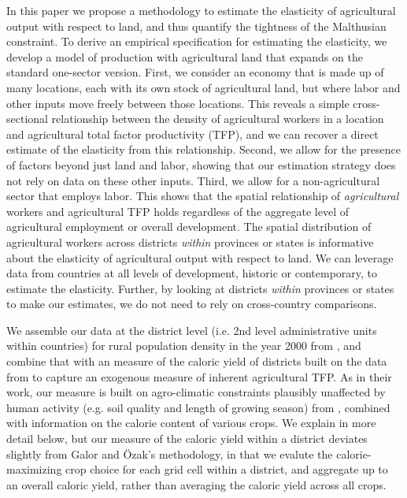 \documentclass[11pt]{article}
\begin{document}
In this paper we propose a methodology to estimate the elasticity of agricultural output with respect to land, and thus quantify the tightness of the Malthusian constraint. To derive an empirical specification for estimating the elasticity, we develop a model of production with agricultural land that expands on the standard one-sector version. First, we consider an economy that is made up of many locations, each with its own stock of agricultural land, but where labor and other inputs move freely between those locations. This reveals a simple cross-sectional relationship between the density of agricultural workers in a location and agricultural total factor productivity (TFP), and we can recover a direct estimate of the elasticity from this relationship. Second, we allow for the presence of factors beyond just land and labor, showing that our estimation strategy does not rely on data on these other inputs. Third, we allow for a non-agricultural sector that employs labor. This shows that the spatial relationship of \textit{agricultural} workers and agricultural TFP holds regardless of the aggregate level of agricultural employment or overall development. The spatial distribution of agricultural workers across districts \textit{within} provinces or states is informative about the elasticity of agricultural output with respect to land. We can leverage data from countries at all levels of development, historic or contemporary, to estimate the elasticity. Further, by looking at districts \textit{within} provinces or states to make our estimates, we do not need to rely on cross-country comparisons.

We assemble our data at the district level (i.e. 2nd level administrative units within countries) for rural population density in the year 2000 from \citet{hyde31}, and combine that with an measure of the caloric yield of districts built on the data from \citet{galorozak2016} to capture an exogenous measure of inherent agricultural TFP. As in their work, our measure is built on agro-climatic constraints plausibly unaffected by human activity (e.g. soil quality and length of growing season) from \citet{gaez}, combined with information on the calorie content of various crops. We explain in more detail below, but our measure of the caloric yield within a district deviates slightly from Galor and {\"O}zak's methodology, in that we evalute the calorie-maximizing crop choice for each grid cell within a district, and aggregate up to an overall caloric yield, rather than averaging the caloric yield across all crops.
\end{document}
